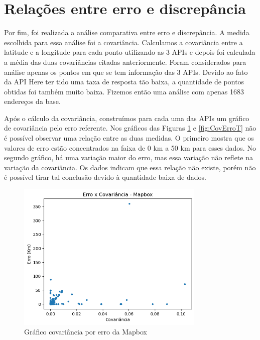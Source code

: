 \section{Relações entre erro e discrepância}

Por fim, foi realizada a análise comparativa entre erro e discrepância. A medida escolhida para essa análise foi a covariância. Calculamos a covariância entre a latitude e a longitude para cada ponto utilizando as 3 APIs e depois foi calculada a média das duas covariâncias citadas anteriormente. Foram considerados para análise apenas os pontos em que se tem informação das 3 APIs. Devido ao fato da API Here ter tido uma taxa de resposta tão baixa, a quantidade de pontos obtidas foi também muito baixa. Fizemos então uma análise com apenas 1683 endereços da base.

Após o cálculo da covariância, construímos para cada uma das APIs um gráfico de covariância pelo erro referente. Nos gráficos das Figuras \ref{fig:CovErroM} e \ref{fig:CovErroT} não é possível observar uma relação entre as duas medidas. O primeiro mostra que os valores de erro estão concentrados na faixa de 0 km a 50 km para esses dados. No segundo gráfico, há uma variação maior do erro, mas essa variação não reflete na variação da covariância. Os dados indicam que essa relação não existe, porém não é possível tirar tal conclusão devido à quantidade baixa de dados.


\begin{figure}[h]
  \centering
  \includegraphics[width=0.8\textwidth]{Figuras/ErroCovM.png}
  \caption{Gráfico covariância por erro da Mapbox}
  \label{fig:CovErroM}
\end{figure}

